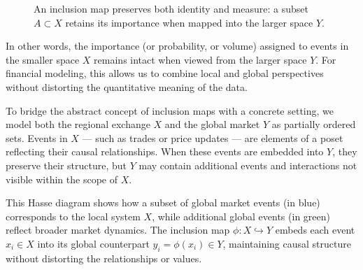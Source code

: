 \begin{figure}[H]
\centering
{}
\caption{An inclusion map preserves both identity and measure: a subset \( A \subset X \) retains its importance when mapped into the larger space \( Y \).}
\end{figure}

In other words, the importance (or probability, or volume) assigned to events in the smaller space \( X \) remains intact when viewed from the larger space \( Y \). For financial modeling, this allows us to combine local and global perspectives without distorting the quantitative meaning of the data.

\vspace{1em}
\noindent
To bridge the abstract concept of inclusion maps with a concrete setting, we model both the regional exchange \( X \) and the global market \( Y \) as partially ordered sets. Events in \( X \) — such as trades or price updates — are elements of a poset reflecting their causal relationships. When these events are embedded into \( Y \), they preserve their structure, but \( Y \) may contain additional events and interactions not visible within the scope of \( X \).

This Hasse diagram shows how a subset of global market events (in blue) corresponds to the local system \( X \), while additional global events (in green) reflect broader market dynamics. The inclusion map \( \phi: X \hookrightarrow Y \) embeds each event \( x_i \in X \) into its global counterpart \( y_i = \phi(x_i) \in Y \), maintaining causal structure without distorting the relationships or values.

